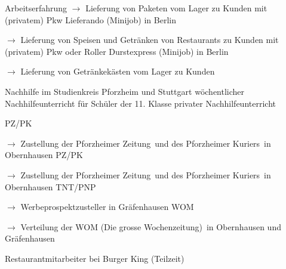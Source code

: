 \begin{rubric}{\textcolor{black!20!blue!100}{Arbeitserfahrung}}
			\setlength{\hangindent}{\widthof{$\rightarrow$ }}
			$\rightarrow$ Lieferung von Paketen vom Lager zu Kunden mit (privatem) Pkw
		\entry*[24/10/2020 --- 04/01/2021]
			Lieferando (Minijob) in Berlin
			
			\setlength{\hangindent}{\widthof{$\rightarrow$ }}
			$\rightarrow$ Lieferung von Speisen und Getränken von Restaurants zu Kunden mit (privatem) Pkw oder Roller
		\entry*[17/07/2020 --- 18/10/2020]
			Durstexpress (Minijob) in Berlin
			
			\setlength{\hangindent}{\widthof{$\rightarrow$ }}
			$\rightarrow$ Lieferung von Getränkekästen vom Lager zu Kunden
				
		\entry*[10/2015 --- 01/2016]
			Nachhilfe im Studienkreis Pforzheim und Stuttgart
		\entry*[10/2011 --- 06/2012]
			wöchentlicher Nachhilfeunterricht für Schüler der 11. Klasse
		\entry*[\phantom{10/}2010 --- 2016]
			privater Nachhilfeunterricht
			
		\entry*[08/2015 --- 09/2015]
			PZ/PK
			
			\setlength{\hangindent}{\widthof{$\rightarrow$ }}
			$\rightarrow$ Zustellung der \glqq Pforzheimer Zeitung\grqq\ und des \glqq Pforzheimer Kuriers\grqq\ in Obernhausen
		\entry*[08/2012 --- 09/2012]
			PZ/PK
			
			\setlength{\hangindent}{\widthof{$\rightarrow$ }}
			$\rightarrow$ Zustellung der \glqq Pforzheimer Zeitung\grqq\ und des \glqq Pforzheimer Kuriers\grqq\ in Obernhausen
		\entry*[06/2009 --- 10/2010]
			TNT/PNP
			
			\setlength{\hangindent}{\widthof{$\rightarrow$ }}
			$\rightarrow$ Werbeprospektzusteller in Gräfenhausen
		\entry*[06/2007 --- 12/2008]
			WOM
			
			\setlength{\hangindent}{\widthof{$\rightarrow$ }}
			$\rightarrow$ Verteilung der \glqq WOM (Die grosse Wochenzeitung)\grqq\ in Obernhausen und Gräfenhausen
			
		\entry*[04/2012 --- 10/2012]
			Restaurantmitarbeiter bei Burger King (Teilzeit)
\end{rubric}